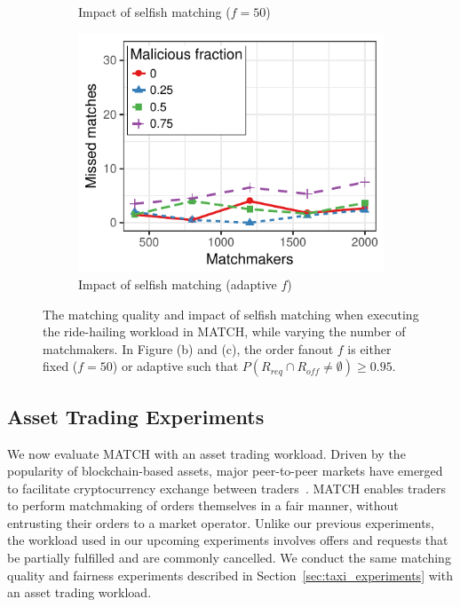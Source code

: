 \begin{figure}[t!]
\begin{subfigure}{.5\columnwidth}
		\caption{Impact of selfish matching ($ f = 50 $)}
		\label{fig:asset_trading_fairness_fixed}
	\end{subfigure}\vspace{0.3cm}
	\begin{subfigure}{.5\columnwidth}
		\centering
		\includegraphics[width=\columnwidth]{match/assets/plots/asset_trading_fairness_adaptive.pdf}
		\caption{Impact of selfish matching (adaptive $ f $)}
		\label{fig:asset_trading_fairness_adaptive}
	\end{subfigure}
	\caption{The matching quality and impact of selfish matching when executing the ride-hailing workload in MATCH, while varying the number of matchmakers. In Figure (b) and (c), the order fanout $ f $ is either fixed  ($ f = 50 $) or adaptive such that $ P(R_{req} \cap R_{off} \neq \emptyset) \geq 0.95 $.}
	\label{fig:asset_trading_experiments}
\end{figure}

\subsection{Asset Trading Experiments}
\label{sec:asset_trading_experiments}
We now evaluate MATCH with an asset trading workload.
Driven by the popularity of blockchain-based assets, major peer-to-peer markets have emerged to facilitate cryptocurrency exchange between traders~\cite{bentov2019tesseract}.
MATCH enables traders to perform matchmaking of orders themselves in a fair manner, without entrusting their orders to a market operator.
Unlike our previous experiments, the workload used in our upcoming experiments involves offers and requests that be partially fulfilled and are commonly cancelled.
We conduct the same matching quality and fairness experiments described in Section~\ref{sec:taxi_experiments} with an asset trading workload. %

